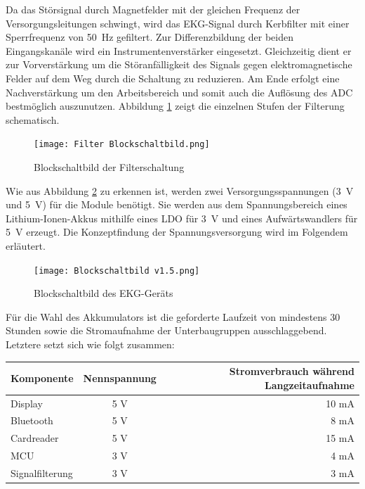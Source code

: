 Da das Störsignal durch Magnetfelder mit der gleichen Frequenz der Versorgungsleitungen schwingt, wird das EKG-Signal durch Kerbfilter mit einer Sperrfrequenz von \SI{50}{\hertz} gefiltert. Zur Differenzbildung der beiden Eingangskanäle wird ein Instrumentenverstärker eingesetzt. Gleichzeitig dient er zur Vorverstärkung um die Störanfälligkeit des Signals gegen elektromagnetische Felder auf dem Weg durch die Schaltung zu reduzieren. Am Ende erfolgt eine Nachverstärkung um den Arbeitsbereich und somit auch die Auflösung des ADC bestmöglich auszunutzen. Abbildung \ref{fig_Blockschaltbild Filter} zeigt die einzelnen Stufen der Filterung schematisch.

\begin{figure} [!h]
	\texttt{[image: Filter Blockschaltbild.png]}
	\caption{Blockschaltbild der Filterschaltung}
	\label{fig_Blockschaltbild Filter} 
\end{figure}

Wie aus Abbildung \ref{fig_Blockschaltbild} zu erkennen ist, werden zwei Versorgungsspannungen (\SI{3}{\volt}  und \SI{5}{\volt}) für die Module benötigt. Sie werden aus dem Spannungsbereich eines Lithium-Ionen-Akkus mithilfe eines LDO für \SI{3}{\volt} und eines Aufwärtswandlers für \SI{5}{\volt} erzeugt. Die Konzeptfindung der Spannungsversorgung wird im Folgendem erläutert.

\begin{figure} [h]
	\texttt{[image: Blockschaltbild v1.5.png]}
	\caption{Blockschaltbild des EKG-Geräts}
	\label{fig_Blockschaltbild} 
\end{figure}

Für die Wahl des Akkumulators ist die geforderte Laufzeit von mindestens 30 Stunden sowie die Stromaufnahme der Unterbaugruppen ausschlaggebend. Letztere setzt sich wie folgt zusammen:
\begin{table}
\center
\begin{tabular}[h]{l|c|r}
Komponente & Nennspannung & Stromverbrauch während Langzeitaufnahme\\
\hline
Display & 5 V & 10 mA \cite{Datenblatt_Nextion}\\
Bluetooth & 5 V & 8 mA \cite{HC-05_Datasheet}\\
Cardreader & 5 V & 15 mA \cite{SD_Karte}\\
MCU & 3 V & 4 mA \cite{Datenblatt_MSP430F5529}\\
Signalfilterung & 3 V & 3 mA \\
\end{tabular}
\end{table}

